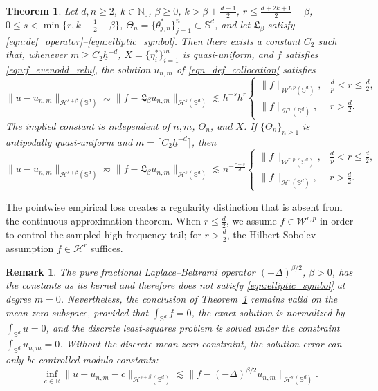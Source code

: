 \documentclass{article}
\numberwithin{equation}{section}
\newtheorem{theorem}{Theorem}
\newtheorem{remark}{Remark}
\def\NN{\mathbb{N}}
\def\SS{\mathbb{S}}
\begin{document}
\begin{theorem}\label{thm:leastsquare}
Let $d,n\geq2$, $k\in\NN_0$, $\beta\geq0$, $k> \beta+\frac{d-1}{2}$, $r\leq\frac{d+2k+1}{2}-\beta$, $0\leq s<\min\{r,k+\frac{1}{2}-\beta\}$, $\Theta_n=\{\theta_{j,n}^*\}_{j=1}^n\subset\SS^d$, and let $\mathfrak L_\beta$ satisfy \eqref{eqn:def_operator}--\eqref{eqn:elliptic_symbol}. Then there exists a constant $C_2$ such that, whenever $m\geq C_2\underline h^{-d}$, $X=\{\eta_i^*\}_{i=1}^m$ is quasi-uniform, and $f$ satisfies \eqref{eqn:f_evenodd_relu}, the solution $u_{n,m}$ of \eqref{eqn_def_collocation} satisfies
\begin{equation}\label{eqn_main_ls_determ}
\|u-u_{n,m}\|_{\mathcal H^{s+\beta}(\SS^d)}\eqsim\|f-\mathfrak L_\beta u_{n,m}\|_{\mathcal H^s(\SS^d)}\lesssim\underline h^{-s}h^r
\begin{cases}
\|f\|_{\mathcal W^{r,p}(\SS^d)},&\frac dp<r\leq \frac{d}{2},\\
\|f\|_{\mathcal H^r(\SS^d)},&r>\frac{d}{2}.
\end{cases}
\end{equation}
The implied constant is independent of $n,m$, $\Theta_n$, and $X$. If $\{\Theta_n\}_{n\geq1}$ is antipodally quasi-uniform and $m=\lceil C_2\underline h^{-d}\rceil$, then
\begin{equation}
\|u-u_{n,m}\|_{\mathcal H^{s+\beta}(\SS^d)}\eqsim\|f-\mathfrak L_\beta u_{n,m}\|_{\mathcal H^s(\SS^d)}\lesssim n^{-\frac{r-s}{d}}
\begin{cases}
\|f\|_{\mathcal W^{r,p}(\SS^d)},&\frac dp<r\leq \frac{d}{2},\\
\|f\|_{\mathcal H^r(\SS^d)},&r>\frac{d}{2}.
\end{cases}
\end{equation}
\end{theorem}

The pointwise empirical loss creates a regularity distinction that is absent from the continuous approximation theorem. When $r\leq \frac{d}{2}$, we assume $f\in\mathcal W^{r,p}$ in order to control the sampled high-frequency tail; for $r>\frac{d}{2}$, the Hilbert Sobolev assumption $f\in\mathcal H^r$ suffices.


\begin{remark}
The pure fractional Laplace--Beltrami operator $(-\Delta)^{\beta/2}$, $\beta>0$, has the constants as its kernel and therefore does not satisfy \eqref{eqn:elliptic_symbol} at degree $m=0$. Nevertheless, the conclusion of Theorem~\ref{thm:leastsquare} remains valid on the mean-zero subspace, provided that $\int_{\mathbb S^d}f=0$, the exact solution is normalized by $\int_{\mathbb S^d}u=0$, and the discrete least-squares problem is solved under the constraint $\int_{\mathbb S^d}u_{n,m}=0$. Without the discrete mean-zero constraint, the solution error can only be controlled modulo constants:
\begin{equation*}
\inf_{c\in\mathbb R}\|u-u_{n,m}-c\|_{\mathcal H^{s+\beta}(\mathbb S^d)}
\lesssim\|f-(-\Delta)^{\beta/2}u_{n,m}\|_{\mathcal H^s(\mathbb S^d)}.
\end{equation*}
\end{remark}
\end{document}
